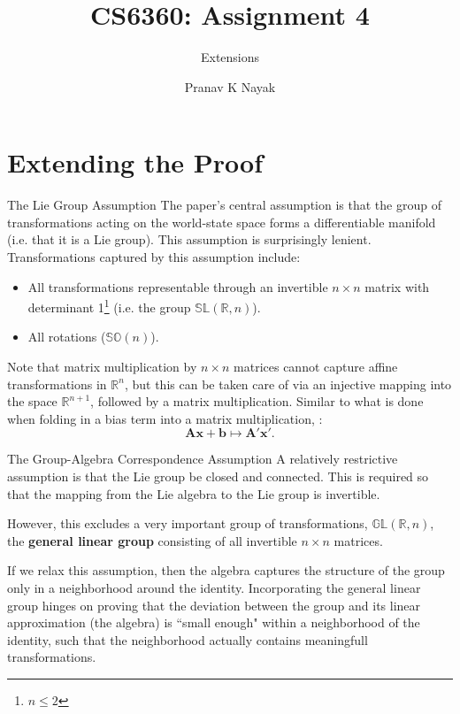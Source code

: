 \documentclass{beamer}
\title{CS6360: Assignment 4}
\subtitle{Extensions}
\author{Pranav K Nayak}
\date{}
\begin{document}
\begin{frame}
  \titlepage
\end{frame}
\section{Extending the Proof}
\begin{frame}{The Lie Group Assumption}
    The paper's central assumption is that the group of transformations acting on the world-state space forms a differentiable manifold (i.e. that it is a Lie group). This assumption is surprisingly lenient.
    Transformations captured by this assumption include:
    \begin{itemize}
      \item All transformations representable through an invertible $n \times n$ matrix with determinant 1\footnote{$n \leq 2$} (i.e. the group $\mathbb{SL}(\mathbb{R}, n)$).
    \item All rotations ($\mathbb{SO}(n)$).
    \end{itemize}         
    Note that matrix multiplication by $n \times n$ matrices cannot capture affine transformations in $\mathbb{R}^n$, but this can be taken care of via an injective mapping into the space $\mathbb{R}^{n+1}$, followed by a matrix multiplication. Similar to what is done when folding in a bias term into a matrix multiplication, :
    \[ 
      \mathbf{A}\mathbf{x} + \mathbf{b} \mapsto \mathbf{A'}\mathbf{x'}
    .\]
    
  \end{frame}
  \begin{frame}{The Group-Algebra Correspondence Assumption}
    A relatively restrictive assumption is that the Lie group be closed and connected. This is required so that the mapping from the Lie algebra to the Lie group is invertible.
    
    However, this excludes a very important group of transformations, $\mathbb{GL}(\mathbb{R}, n)$, the \textbf{general linear group} consisting of all invertible $n \times n$ matrices.

    If we relax this assumption, then the algebra captures the structure of the group only in a neighborhood around the identity. Incorporating the general linear group hinges on proving that the deviation between the group and its linear approximation (the algebra) is ``small enough" within a neighborhood of the identity, such that the neighborhood actually contains meaningfull transformations.
  \end{frame}
\end{document}
